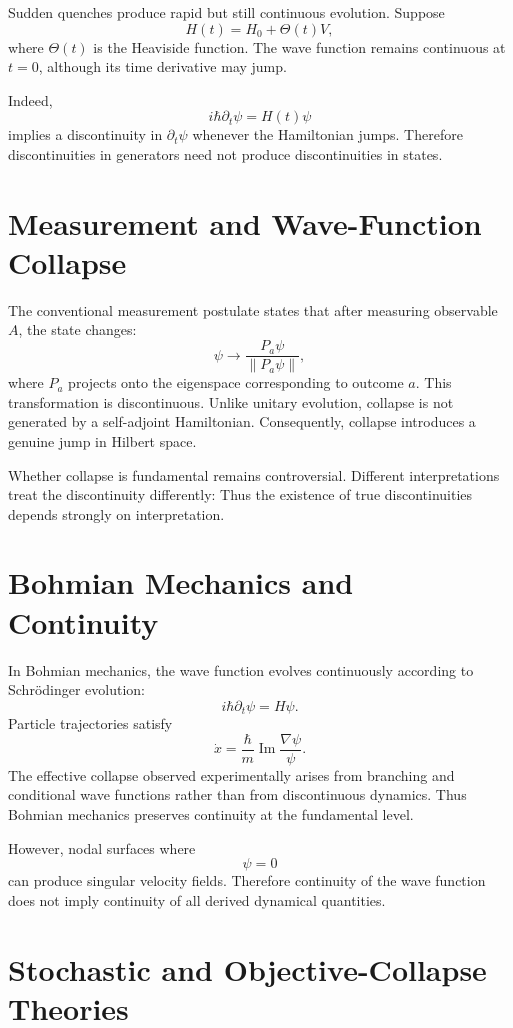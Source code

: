 \documentclass[11pt]{article}
\begin{document}
Sudden quenches produce rapid but still continuous evolution.
Suppose
\[
H(t)=H_0+\Theta(t)V,
\]
where \(\Theta(t)\) is the Heaviside function.
The wave function remains continuous at \(t=0\), although its 
time derivative may jump.

Indeed,
\[
i\hbar \partial_t \psi = H(t)\psi
\]
implies a discontinuity in \(\partial_t\psi\) whenever the Hamiltonian jumps.
Therefore discontinuities in generators need not produce discontinuities in states.

\section{ Measurement and Wave-Function Collapse}

The conventional measurement postulate states that after measuring 
observable \(A\), the state changes:
\[
\psi \to \frac{P_a\psi}{\|P_a\psi\|},
\]
where \(P_a\) projects onto the eigenspace corresponding to outcome \(a\).
This transformation is discontinuous.
Unlike unitary evolution, collapse is not generated by a self-adjoint Hamiltonian.
Consequently, collapse introduces a genuine jump in Hilbert space.

Whether collapse is fundamental remains controversial.
Different interpretations treat the discontinuity differently:
Thus the existence of true discontinuities depends strongly on interpretation.

\section{ Bohmian Mechanics and Continuity}

In Bohmian mechanics, the wave function evolves continuously according
to Schrödinger evolution:
\[
i\hbar\partial_t\psi = H\psi.
\]
Particle trajectories satisfy
\[
\dot x = \frac{\hbar}{m}\operatorname{Im}
\frac{\nabla\psi}{\psi}.
\]
The effective collapse observed experimentally arises from branching and 
conditional wave functions rather than from discontinuous dynamics.
Thus Bohmian mechanics preserves continuity at the fundamental level.

However, nodal surfaces where
\[
\psi=0
\]
can produce singular velocity fields.
Therefore continuity of the wave function does not imply continuity of 
all derived dynamical quantities.

\section{ Stochastic and Objective-Collapse Theories}
\end{document}
